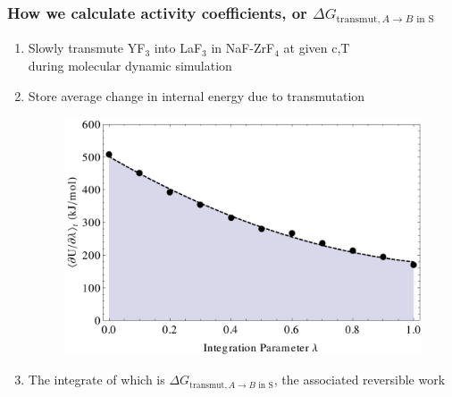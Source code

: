 \documentclass{beamer}
\begin{document}
\begin{frame}
    \frametitle{How we calculate activity coefficients, or $\Delta G_{\text{transmut},A\rightarrow B\text{ in S}}$}
    \begin{enumerate}
        \item Slowly transmute YF$_3$ into LaF$_3$ in NaF-ZrF$_4$ at given c,T\\ during molecular dynamic simulation
        \item Store average change in internal energy due to transmutation
            \begin{figure}
                \includegraphics[width=.6\textwidth]{dudl_of_l}
            \end{figure}
        \item The integrate of which is $\Delta G_{\text{transmut},A\rightarrow B\text{ in S}}$, the associated reversible work
    \end{enumerate}
\end{frame}
\end{document}
